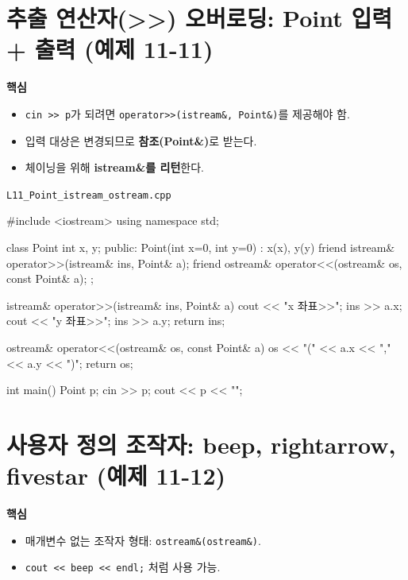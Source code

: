 \documentclass[11pt,a4paper]{article}
\newcommand{\filetag}[1]{\texttt{\color{Accent}#1}}
\begin{document}
\section{추출 연산자(>>) 오버로딩: Point 입력 + 출력 (예제 11-11)}
\begin{GoalBox}
\textbf{핵심}
\begin{itemize}[leftmargin=18pt]
  \item \texttt{cin >> p}가 되려면 \texttt{operator>>(istream\&, Point\&)}를 제공해야 함. %
  \item 입력 대상은 변경되므로 \textbf{참조(Point\&)}로 받는다.
  \item 체이닝을 위해 \textbf{istream\&를 리턴}한다.
\end{itemize}
\end{GoalBox}

\noindent\filetag{L11\_Point\_istream\_ostream.cpp}
\begin{cppcode}
#include <iostream>
using namespace std;

class Point {
    int x, y;
public:
    Point(int x=0, int y=0) : x(x), y(y) {}
    friend istream& operator>>(istream& ins, Point& a);
    friend ostream& operator<<(ostream& os, const Point& a);
};

istream& operator>>(istream& ins, Point& a) {
    cout << "x 좌표>>";
    ins >> a.x;
    cout << "y 좌표>>";
    ins >> a.y;
    return ins;
}

ostream& operator<<(ostream& os, const Point& a) {
    os << "(" << a.x << "," << a.y << ")";
    return os;
}

int main() {
    Point p;
    cin >> p;
    cout << p << "\n";
}
\end{cppcode}

\section{사용자 정의 조작자: beep, rightarrow, fivestar (예제 11-12)}
\begin{GoalBox}
\textbf{핵심}
\begin{itemize}[leftmargin=18pt]
  \item 매개변수 없는 조작자 형태: \texttt{ostream\&(ostream\&)}. %
  \item \texttt{cout << beep << endl;} 처럼 사용 가능.
\end{itemize}
\end{GoalBox}
\end{document}
